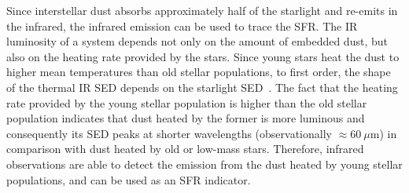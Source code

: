 Since interstellar dust absorbs approximately half of the starlight and re-emits in the infrared, the infrared emission can be used to trace the SFR.
The IR luminosity of a system depends not only on the amount of embedded dust, but also on the heating rate provided by the stars. 
Since young stars heat the dust to higher mean temperatures than old stellar populations, to first order, the shape of the thermal IR SED depends on the starlight SED~\citep{Helou86}.
The fact that the heating rate provided by the young stellar population is higher than the old stellar population indicates that dust heated by the former is more luminous and consequently its SED peaks at shorter wavelengths (observationally $\approx 60~\mu$m) in comparison with dust heated by old or low-mass stars.
Therefore, infrared observations are able to detect the emission from the dust heated by young stellar populations, and can be used as an SFR indicator.  

